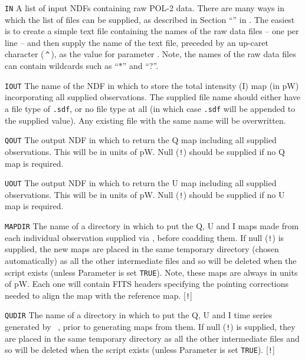 \begin{aligndesc}
\item[\texttt{IN}] A list of input NDFs containing raw POL-2 data.
  There are many ways in which the list of files can be supplied, as
  described in Section ``'' in . The
  easiest is to create a simple text file containing the names of the
  raw data files -- one per line -- and then supply the name of the
  text file, preceded by an up-caret character (\,\texttt{\^{}}\,), as
  the value for parameter . Note, the names of the raw data
  files can contain wildcards such as ``$*$'' and ``?''.

\item[\texttt{IOUT}] The name of the NDF in which to store the
  total intensity (I) map (in pW) incorporating all supplied observations.
  The supplied file name should either have a file type of
  \texttt{.sdf}, or no file type at all (in which case
  \texttt{.sdf} will be appended to the supplied value). Any existing
  file with the same name will be overwritten.

\item[\texttt{QOUT}] The output NDF in which to return the Q map
  including all supplied observations. This will be in units of
  pW. Null (\texttt{!}) should be supplied if no Q map is required.

\item[\texttt{UOUT}] The output NDF in which to return the U map
  including all supplied observations. This will be in units of
  pW. Null (\texttt{!}) should be supplied if no U map is required.

\item[\texttt{MAPDIR}] The name of a directory in which to put the Q,
  U and I maps made from each individual observation supplied via
  , before coadding them. If null (\texttt{!}) is supplied, the new maps are
  placed in the same temporary directory (chosen automatically) as all the
  other intermediate files and so will be deleted when the script exists
  (unless Parameter  is set \texttt{TRUE}). Note, these maps are always in
  units of pW. Each one will contain FITS headers specifying the pointing
  corrections needed to align the map with the reference map. [\texttt{!}]


\item[\texttt{QUDIR}] The name of a directory in which to put the Q, U
  and I time series generated by \SMURF\ , prior to generating
  maps from them. If null (\texttt{!}) is supplied, they are placed in the same
  temporary directory as all the other intermediate files and so will
  be deleted when the script exists (unless Parameter  is set
  \texttt{TRUE}). [\texttt{!}]
\end{aligndesc}

